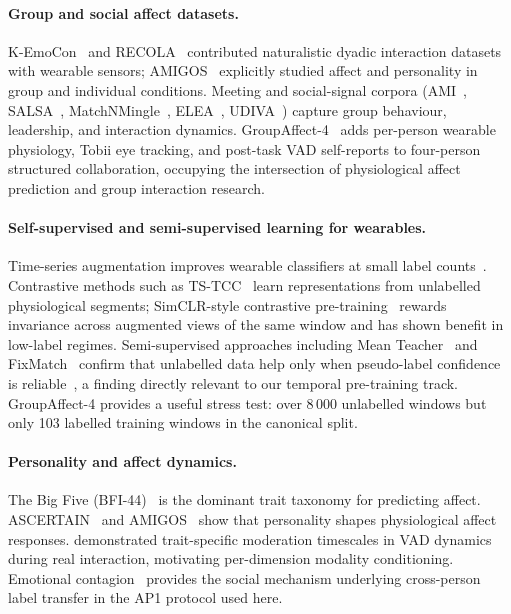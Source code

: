 \documentclass[sigconf,review,anonymous]{acmart}
\begin{document}
\paragraph{Group and social affect datasets.}
K-EmoCon~\cite{park2020kemocon} and RECOLA~\cite{ringeval2013introducing}
contributed naturalistic dyadic interaction datasets with wearable sensors;
AMIGOS~\cite{mirandacorrea2021amigos} explicitly studied affect and personality
in group and individual conditions.
Meeting and social-signal corpora (AMI~\cite{mccowan2005ami},
SALSA~\cite{alameda2015salsa},
MatchNMingle~\cite{cabrera2018matchnmingle},
ELEA~\cite{sanchez2012emergent},
UDIVA~\cite{palmero2021context}) capture group behaviour, leadership, and
interaction dynamics.
GroupAffect-4~\cite{groupaffect4} adds per-person wearable physiology, Tobii
eye tracking, and post-task VAD self-reports to four-person structured
collaboration, occupying the intersection of physiological affect prediction
and group interaction research.

\paragraph{Self-supervised and semi-supervised learning for wearables.}
Time-series augmentation improves wearable classifiers at small label
counts~\cite{um2017data,iwana2021augmentation}.
Contrastive methods such as TS-TCC~\cite{eldele2021tscc} learn representations
from unlabelled physiological segments; SimCLR-style contrastive
pre-training~\cite{chen2020simclr} rewards invariance across augmented views of
the same window and has shown benefit in low-label regimes.
Semi-supervised approaches including Mean Teacher~\cite{tarvainen2017mean} and
FixMatch~\cite{sohn2020fixmatch} confirm that unlabelled data help only when
pseudo-label confidence is reliable~\cite{lee2013pseudo},
a finding directly relevant to our temporal pre-training track.
GroupAffect-4 provides a useful stress test: over 8\,000 unlabelled windows
but only 103 labelled training windows in the canonical split.

\paragraph{Personality and affect dynamics.}
The Big Five (BFI-44)~\cite{john1999bigfive} is the dominant trait
taxonomy for predicting affect.
ASCERTAIN~\cite{subramanian2018ascertain} and AMIGOS~\cite{mirandacorrea2021amigos}
show that personality shapes physiological affect responses.
\citet{meng2026moderating} demonstrated trait-specific moderation timescales
in VAD dynamics during real interaction, motivating per-dimension modality
conditioning.
Emotional contagion~\cite{hatfield1993emotional} provides the social
mechanism underlying cross-person label transfer in the AP1 protocol used
here.
\end{document}
